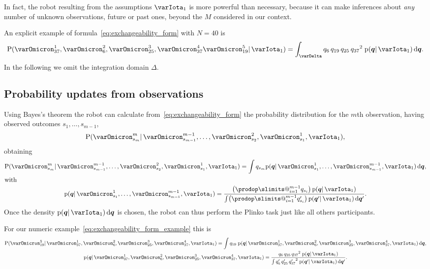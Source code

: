 \documentclass[\ifafour a4paper,12pt,\else a5paper,10pt,\fi%
onecolumn,oneside,article,%
british%
]{memoir}
\makeatletter
\theoremstyle{remark}
\theoremstyle{innote}
\def\prod{\DOTSI\prodop\slimits@}
\newcommand*{\di}{\mathrm{d}}%
\newcommand*{\pf}{\mathrm{p}}%
\newcommand*{\p}{\mathrm{P}}%
\renewcommand*{\|}{\mathpunct{|}}
\newcommand*{\simpl}{\varDelta}
\newcommand*{\yqq}{q}
\newcommand*{\yq}{\bm{\yqq}}
\newcommand*{\yI}{\varIota}
\newcommand*{\yO}{\varOmicron}
\newcommand*{\yMJ}{\yI_1}
\makeatother
\begin{document}
In fact, the robot resulting from the assumptions $\yMJ$ is more powerful
than necessary, because it can make inferences about \emph{any} number of
unknown observations, future or past ones, beyond the $M$ considered in our
context.

An explicit example of formula~\eqref{eq:exchangeability_form} with $N=40$ is
\begin{equation}
  \label{eq:exchangeability_form_example}
  \p(\yO^1_{37} , \yO^2_{6} , \yO^3_{25}, \yO^4_{37} \yO^5_{19}\| \yMJ) =
  \int_\simpl \yqq_{6}\,\yqq_{19}\, \yqq_{25} \, {\yqq_{37}}^2\;
  \pf(\yq \| \yMJ)\,\di\yq.
\end{equation}
In the following we omit the integration domain $\simpl$.

\subsection{Probability updates from observations}
\label{sec:update_first_robot}

Using Bayes's theorem the robot can calculate
from~\eqref{eq:exchangeability_form} the probability distribution for the
$m$th observation, having observed outcomes $s_1,\dotsc,s_{m-1}$,
\begin{equation}
  \label{eq:general_prediction}
  \p(\yO^{m}_{s_{m}} \|
  \yO^{m-1}_{s_{m-1}}, \dotsc,  \yO^2_{s_2}, \yO^1_{s_1},  \yMJ),
\end{equation}
obtaining
\begin{subequations}\label{eq:prediction_exchangeability}
  \begin{gather}
    \p(\yO^{m}_{s_{m}}\| \yO^{m-1}_{s_{m-1}}, \dotsc,  \yO^2_{s_2}, \yO^1_{s_1}, \yMJ)
    = \int \yqq_{s_{m}} \pf(\yq \| \yO^1_{s_1}, \dotsc, \yO^{m-1}_{s_{m-1}}, \yMJ)\,\di\yq,
    \\
    \shortintertext{with}
    \pf(\yq \| \yO^1_{s_1}, \dotsc, \yO^{m-1}_{s_{m-1}}, \yMJ)
    = \frac{ \bigl( \prod_{i=1}^{m-1} \yqq_{s_i} \bigr)\, \pf(\yq \| \yMJ)
      }{
      \int  \bigl( \prod_{i=1}^{m-1} \yqq_{s_i}' \bigr)\, \pf(\yq' \| \yMJ)\,\di\yq'
      }.
\label{eq:exchang_updated_prior}
  \end{gather}
\end{subequations}
Once the density $\pf(\yq \| \yMJ)\,\di\yq$ is chosen, the robot can thus perform
the Plinko task just like all others participants.

For our numeric example~\eqref{eq:exchangeability_form_example} this is
\begin{subequations}\label{eq:prediction_exchangeability_example}
  \begin{gather}
    \p(\yO^5_{19} \| \yO^1_{37} , \yO^2_{6} , \yO^3_{25}, \yO^4_{37}, \yMJ)
    = \int \yqq_{19}\; \pf(\yq \|  \yO^1_{37} , \yO^2_{6} , \yO^3_{25}, \yO^4_{37}, \yMJ)\,\di\yq,
    \\
    \pf(\yq \|  \yO^1_{37} , \yO^2_{6} , \yO^3_{25}, \yO^4_{37}, \yMJ)
    = \frac{ \yqq_{6}\, \yqq_{25} \, {\yqq_{37}}^2\; \pf(\yq \| \yMJ)
    }{
      \int \yqq_{6}'\, \yqq_{25}' \, {\yqq_{37}'}^2\; \pf(\yq' \| \yMJ)\,\di\yq'
    }.
  \end{gather}
\end{subequations}
\end{document}
